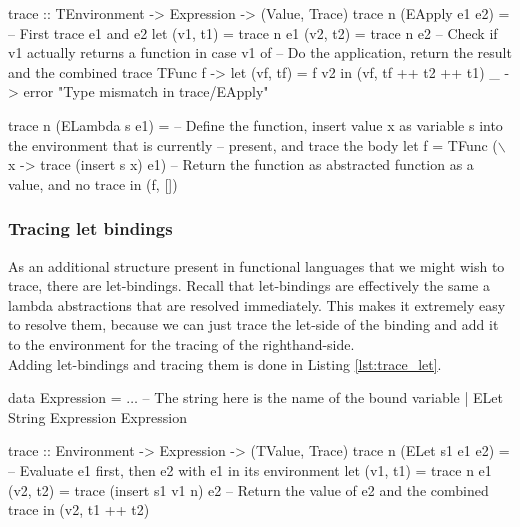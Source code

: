         \begin{haskell}[caption=Tracing away functions, label=lst:trace_func, gobble=12]
            trace :: TEnvironment -> Expression -> (Value, Trace)
            trace n (EApply e1 e2) =
                -- First trace e1 and e2
                let (v1, t1) = trace n e1
                    (v2, t2) = trace n e2
                -- Check if v1 actually returns a function
                in  case v1 of
                    -- Do the application, return the result and the combined trace
                    TFunc f -> let (vf, tf) = f v2
                               in  (vf, tf ++ t2 ++ t1)
                    _       -> error "Type mismatch in trace/EApply"
            
            trace n (ELambda s e1) =
                -- Define the function, insert value x as variable s into the environment that is currently 
                -- present, and trace the body
                let f = TFunc ($\backslash$x -> trace (insert s x) e1)
                -- Return the function as abstracted function as a value, and no trace
                in  (f, [])
        \end{haskell}

        \subsubsection{Tracing let bindings} \label{sec:structures}
            As an additional structure present in functional languages that we might wish to trace, there are let-bindings.
            Recall that let-bindings are effectively the same a lambda abstractions that are resolved immediately.
            This makes it extremely easy to resolve them, because we can just trace the let-side of the binding and add it to the environment for the tracing of the righthand-side.\\
            Adding let-bindings and tracing them is done in Listing \ref{lst:trace_let}.

            \begin{haskell}[caption=Tracing let bindings, label=lst:trace_let, gobble=16]
                data Expression
                    = $\ldots$
                    -- The string here is the name of the bound variable
                    | ELet String Expression Expression

                trace :: Environment -> Expression -> (TValue, Trace)
                trace n (ELet s1 e1 e2) =
                    -- Evaluate e1 first, then e2 with e1 in its environment
                    let (v1, t1) = trace n e1
                        (v2, t2) = trace (insert s1 v1 n) e2
                    -- Return the value of e2 and the combined trace
                    in  (v2, t1 ++ t2)
            \end{haskell}

